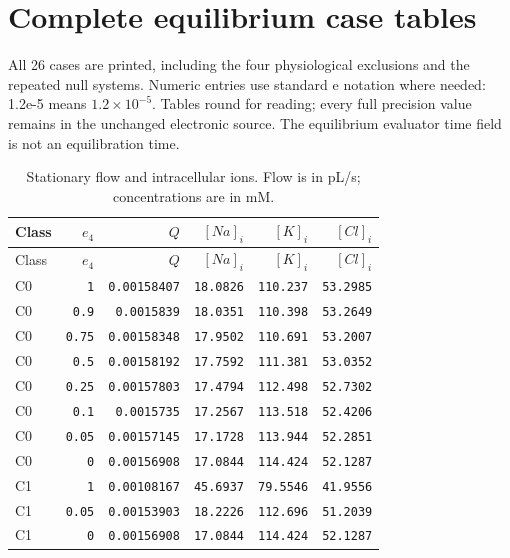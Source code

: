 \section{Complete equilibrium case tables}
All 26 cases are printed, including the four physiological exclusions and the repeated null systems. Numeric entries use standard e notation where needed: 1.2e-5 means $1.2\times10^{-5}$. Tables round for reading; every full precision value remains in the unchanged electronic source. The equilibrium evaluator time field is not an equilibration time.

\begingroup\footnotesize
\setlength{\tabcolsep}{3pt}
\begin{longtable}{lrrrrr}
\caption{Stationary flow and intracellular ions. Flow is in pL/s; concentrations are in mM.}\\
\toprule
Class & $e_4$ & $Q$ & $[Na]_i$ & $[K]_i$ & $[Cl]_i$ \\
\midrule\endfirsthead
\toprule
Class & $e_4$ & $Q$ & $[Na]_i$ & $[K]_i$ & $[Cl]_i$ \\
\midrule\endhead
\bottomrule\endfoot
C0 & \texttt{1} & \texttt{0.00158407} & \texttt{18.0826} & \texttt{110.237} & \texttt{53.2985} \\
C0 & \texttt{0.9} & \texttt{0.0015839} & \texttt{18.0351} & \texttt{110.398} & \texttt{53.2649} \\
C0 & \texttt{0.75} & \texttt{0.00158348} & \texttt{17.9502} & \texttt{110.691} & \texttt{53.2007} \\
C0 & \texttt{0.5} & \texttt{0.00158192} & \texttt{17.7592} & \texttt{111.381} & \texttt{53.0352} \\
C0 & \texttt{0.25} & \texttt{0.00157803} & \texttt{17.4794} & \texttt{112.498} & \texttt{52.7302} \\
C0 & \texttt{0.1} & \texttt{0.0015735} & \texttt{17.2567} & \texttt{113.518} & \texttt{52.4206} \\
C0 & \texttt{0.05} & \texttt{0.00157145} & \texttt{17.1728} & \texttt{113.944} & \texttt{52.2851} \\
C0 & \texttt{0} & \texttt{0.00156908} & \texttt{17.0844} & \texttt{114.424} & \texttt{52.1287} \\
C1 & \texttt{1} & \texttt{0.00108167} & \texttt{45.6937} & \texttt{79.5546} & \texttt{41.9556} \\
C1 & \texttt{0.05} & \texttt{0.00153903} & \texttt{18.2226} & \texttt{112.696} & \texttt{51.2039} \\
C1 & \texttt{0} & \texttt{0.00156908} & \texttt{17.0844} & \texttt{114.424} & \texttt{52.1287} \\

\end{longtable}
